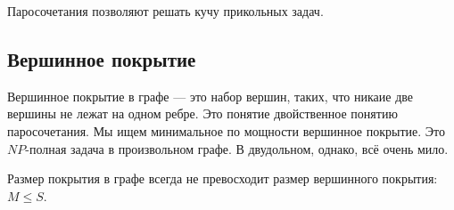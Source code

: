 Паросочетания позволяют решать кучу прикольных задач.

\subsection*{Вершинное покрытие}
Вершинное покрытие в графе --- это набор вершин, таких, что никаие две вершины не лежат на одном ребре.
Это понятие двойственное понятию паросочетания.
Мы ищем минимальное по мощности вершинное покрытие. 
Это $NP$-полная задача в произвольном графе.
В двудольном, однако, всё очень мило.

Размер покрытия в графе всегда не превосходит размер вершинного покрытия: $M \leqslant S$.

